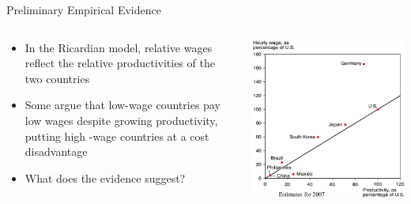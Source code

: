 \documentclass[10pt,hyperref={CJKbookmarks=true},xcolor=dvipsnames,aspectratio=169]{beamer}
\begin{document}
\begin{frame}{Preliminary Empirical Evidence }


\begin{columns}[onlytextwidth]
\begin{column}{0.5\textwidth}
\begin{itemize}
\item In the Ricardian model, relative wages reflect the relative productivities
of the two countries 
\item Some argue that low-wage countries pay low wages despite growing productivity,
putting high -wage countries at a cost disadvantage 
\item What does the evidence suggest? 

\end{itemize}

\end{column}
\begin{column}{0.5\textwidth}
\includegraphics[width=0.8\columnwidth]{fig/ricardo/lec3-14}
\end{column}
\end{columns}
\pause
{}

\end{frame}
\end{document}
